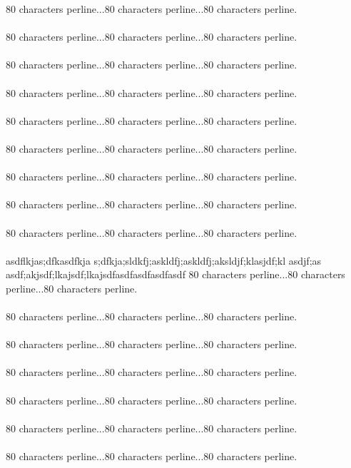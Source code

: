 {80 characters perline...80 characters perline...80 characters perline.\asdf\\\\
80 characters perline...80 characters perline...80 characters perline.\asdf\\\\
80 characters perline...80 characters perline...80 characters perline.\asdf\\\\
80 characters perline...80 characters perline...80 characters perline.\asdf\\\\
80 characters perline...80 characters perline...80 characters perline.\asdf\\\\
80 characters perline...80 characters perline...80 characters perline.\asdf\\\\
80 characters perline...80 characters perline...80 characters perline.\asdf\\\\
80 characters perline...80 characters perline...80 characters perline.\asdf\\\\
80 characters perline...80 characters perline...80 characters perline.\asdf\\\\
asdflkjas;dfkasdfkja s;dfkja;sldkfj;askldfj;askldfj;aksldjf;klasjdf;kl asdjf;as
asdf;akjsdf;lkajsdf;lkajsdfasdfasdfasdfasdf
80 characters perline...80 characters perline...80 characters perline.\asdf\\\\
80 characters perline...80 characters perline...80 characters perline.\asdf\\\\
80 characters perline...80 characters perline...80 characters perline.\asdf\\\\
80 characters perline...80 characters perline...80 characters perline.\asdf\\\\
80 characters perline...80 characters perline...80 characters perline.\asdf\\\\
80 characters perline...80 characters perline...80 characters perline.\asdf\\\\
80 characters perline...80 characters perline...80 characters perline.\asdf\\\\
}
